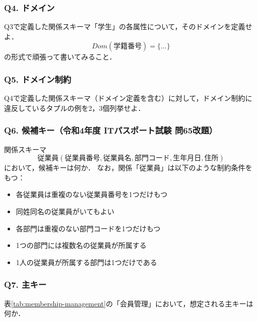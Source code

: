 \subsubsection{Q4. ドメイン}
Q3で定義した関係スキーマ「学生」の各属性について，そのドメインを定義せよ．
\begin{equation}
Dom(学籍番号) = \{ ... \}
\end{equation}
の形式で頑張って書いてみること．

\subsubsection{Q5. ドメイン制約}
Q4で定義した関係スキーマ（ドメイン定義を含む）に対して，ドメイン制約に違反しているタプルの例を2，3個列挙せよ．


\subsubsection{Q6. 候補キー（令和4年度 ITパスポート試験 問65改題）}
関係スキーマ
\begin{equation}
従業員(従業員番号, 従業員名, 部門コード, 生年月日, 住所)
\end{equation}
において，候補キーは何か．
なお，関係「従業員」は以下のような制約条件をもつ：
\begin{itemize}
\item 各従業員は重複のない従業員番号を1つだけもつ
\item 同姓同名の従業員がいてもよい
\item 各部門は重複のない部門コードを1つだけもつ
\item 1つの部門には複数名の従業員が所属する
\item 1人の従業員が所属する部門は1つだけである
\end{itemize}


\subsubsection{Q7. 主キー}
表\ref{tab:membership-management}の「会員管理」において，想定される主キーは何か．

